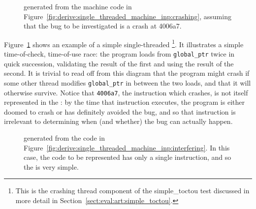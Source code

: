 \begin{figure}
  \begin{center}
  \end{center}
  \caption{{\StateMachine} generated from the machine code in
    Figure~\ref{fig:derive:single_threaded_machine_inp:crashing},
    assuming that the bug to be investigated is a crash at
    4006a7.}
  \label{fig:derive:single_threaded_machine}
\end{figure}

Figure~\ref{fig:derive:single_threaded_machine} shows an example of a
simple single-threaded {\StateMachine}\footnote{This is the crashing
  thread component of the simple\_toctou test discussed in more detail
  in Section~\ref{sect:eval:art:simple_toctou}.}.  It illustrates a
simple time-of-check, time-of-use race: the program loads from
\verb|global_ptr| twice in quick succession, validating the result of
the first and using the result of the second.  It is trivial to read
off from this diagram that the program might crash if some other
thread modifies \verb|global_ptr| in between the two loads, and that
it will otherwise survive.  Notice that \verb|4006a7|, the instruction
which crashes, is not itself represented in the {\StateMachine}: by
the time that instruction executes, the program is either doomed to
crash or has definitely avoided the bug, and so that instruction is
irrelevant to determining when (and whether) the bug can actually
happen.

\begin{figure}
  \begin{center}
  \end{center}
  \caption{{\STateMachine} generated from the code in
    Figure~\ref{fig:derive:single_threaded_machine_inp:interfering}.
    In this case, the code to be represented has only a single
    instruction, and so the {\StateMachine} is very
    simple. }
  \label{fig:derive:single_threaded_machine_write}
\end{figure}

